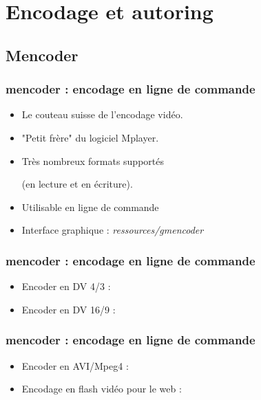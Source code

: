\section{Encodage et autoring}
\subsection{Mencoder}
\begin{frame}
\frametitle{\textbf{mencoder} : encodage en ligne de commande}

\begin{itemize}
\item Le couteau suisse de l'encodage vidéo.
\item "Petit frère" du logiciel Mplayer.
\item Très nombreux formats supportés

(en lecture et en écriture).
\item Utilisable en ligne de commande
\item Interface graphique : \textit{ressources/gmencoder}
\end{itemize}
\end{frame}

\begin{frame}
\frametitle{\textbf{mencoder} : encodage en ligne de commande}

\begin{itemize}
\item Encoder en DV 4/3 : 


\item Encoder en DV 16/9 : 

\end{itemize}
\end{frame}

\begin{frame}
\frametitle{\textbf{mencoder} : encodage en ligne de commande}
\begin{itemize}
\item Encoder en AVI/Mpeg4 :


\item Encodage en flash vidéo pour le web :

\end{itemize}
\end{frame}

